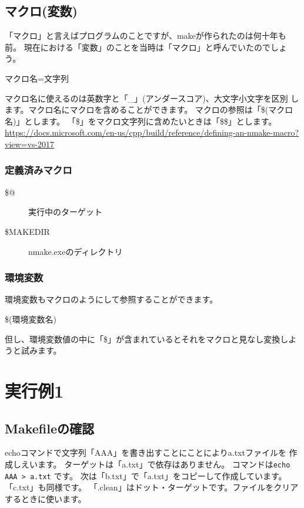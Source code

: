 \documentclass[dvipdfmx]{jsarticle}
\begin{document}
\subsection{マクロ(変数)}
「マクロ」と言えばプログラムのことですが、makeが作られたのは何十年も前。
現在における「変数」のことを当時は「マクロ」と呼んでいたのでしょう。 \par
\vspace{\baselineskip}
マクロ名=文字列 \par
\vspace{\baselineskip}
マクロ名に使えるのは英数字と「\_」(アンダースコア)、大文字小文字を区別
します。マクロ名にマクロを含めることができます。
マクロの参照は「\$(マクロ名)」とします。
「\$」をマクロ文字列に含めたいときは「\$\$」とします。
\url{https://docs.microsoft.com/en-us/cpp/build/reference/defining-an-nmake-macro?view=vs-2017}

\subsubsection{定義済みマクロ}

\begin{description}
\item[\$@] 実行中のターゲット
\item[\$MAKEDIR] nmake.exeのディレクトリ
\end{description}

\subsubsection{環境変数}
環境変数もマクロのようにして参照することができます。\par
\vspace{\baselineskip}
\$(環境変数名)
\vspace{\baselineskip} \par
但し、環境変数値の中に「\$」が含まれているとそれをマクロと見なし変換しようと試みます。


\section{実行例1}

\subsection{Makefileの確認}
echoコマンドで文字列「AAA」を書き出すことにことによりa.txtファイルを
作成しえいます。
ターゲットは「a.txt」で依存はありません。
コマンドは\verb+echo AAA > a.txt+
です。
次は「b.txt」で「a.txt」をコピーして作成しています。
「c.txt」も同様です。
「.clean」はドット・ターゲットです。ファイルをクリアするときに使います。
\end{document}
